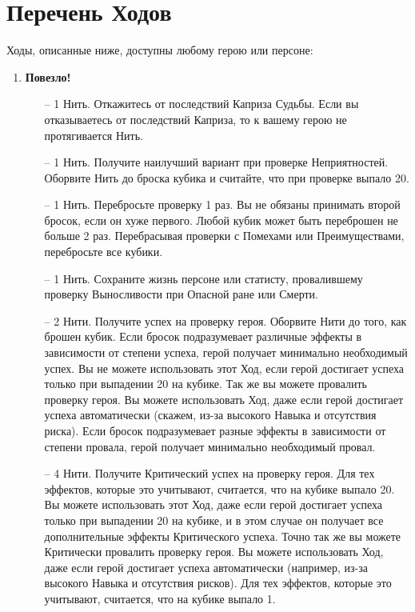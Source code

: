 \section{Перечень Ходов}
Ходы, описанные ниже, доступны любому герою или персоне:
\begin{enumerate}
\item \textbf{Повезло!}
\begin{itemize}
\item[--] 1 Нить. Откажитесь от последствий Каприза Судьбы. Если вы отказываетесь от последствий Каприза, то к вашему герою не протягивается Нить.
\item[--] 1 Нить. Получите наилучший вариант при проверке Неприятностей. Оборвите Нить до броска кубика и считайте, что при проверке выпало 20.
\item[--] 1 Нить. Перебросьте проверку 1 раз. Вы не обязаны принимать второй бросок, если он хуже первого. Любой кубик может быть переброшен не больше 2 раз. Перебрасывая проверки с Помехами или Преимуществами, перебросьте все кубики.
\item[--] 1 Нить. Сохраните жизнь персоне или статисту, провалившему проверку Выносливости при Опасной ране или Смерти.
\item[--] 2 Нити. Получите успех на проверку героя. Оборвите Нити до того, как брошен кубик. Если бросок подразумевает различные эффекты в зависимости от степени успеха, герой получает минимально необходимый успех. Вы не можете использовать этот Ход, если герой достигает успеха только при выпадении 20 на кубике.
Так же вы можете провалить проверку героя. Вы можете использовать Ход, даже если герой достигает успеха автоматически (скажем, из-за высокого Навыка и отсутствия риска). Если бросок подразумевает разные эффекты в зависимости от степени провала, герой получает минимально необходимый провал.
\item[--] 4 Нити. Получите Критический успех на проверку героя. Для тех эффектов, которые это учитывают, считается, что на кубике выпало 20. Вы можете использовать этот Ход, даже если герой достигает успеха только при выпадении 20 на кубике, и в этом случае он получает все дополнительные эффекты Критического успеха.
Точно так же вы можете Критически провалить проверку героя. Вы можете использовать Ход, даже если герой достигает успеха автоматически (например, из-за высокого Навыка и отсутствия рисков). Для тех эффектов, которые это учитывают, считается, что на кубике выпало 1.
\end{itemize}


\end{enumerate}
